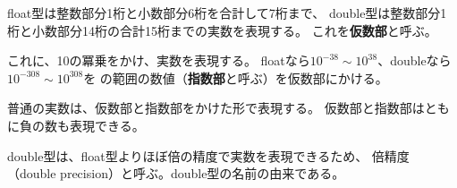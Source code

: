\documentclass[12pt,a4j]{jarticle}
\begin{document}
float型は整数部分1桁と小数部分6桁を合計して7桁まで、
double型は整数部分1桁と小数部分14桁の合計15桁までの実数を表現する。
これを{\bfseries 仮数部}と呼ぶ。

これに、10の冪乗をかけ、実数を表現する。
floatなら$10^{-38}\sim10^{38}$、doubleなら$10^{-308}\sim10^{308}$を
の範囲の数値（{\bfseries 指数部}と呼ぶ）を仮数部にかける。

普通の実数は、仮数部と指数部をかけた形で表現する。
仮数部と指数部はともに負の数も表現できる。


double型は、float型よりほぼ倍の精度で実数を表現できるため、
倍精度（double precision）と呼ぶ。double型の名前の由来である。
\end{document}
